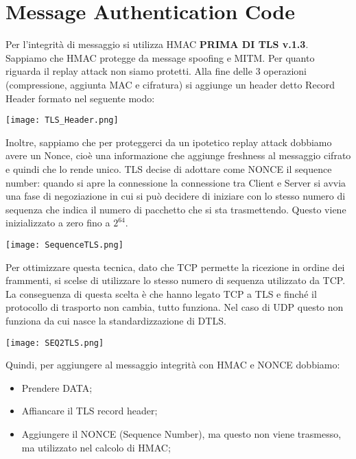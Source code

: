 \documentclass{article}
\theoremstyle{remark}
\begin{document}
\section{Message Authentication Code}
Per l'integrità di messaggio si utilizza HMAC \textbf{PRIMA DI TLS v.1.3}. Sappiamo che HMAC protegge da message spoofing e MITM. Per quanto riguarda il replay attack non siamo protetti. Alla fine delle 3 operazioni (compressione, aggiunta MAC e cifratura) si aggiunge un header detto Record Header formato nel seguente modo:
\begin{center}
    \texttt{[image: TLS\_Header.png]}
\end{center}
Inoltre, sappiamo che per proteggerci da un ipotetico replay attack dobbiamo avere un Nonce, cioè una informazione che aggiunge freshness al messaggio cifrato e quindi che lo rende unico. TLS decise di adottare come NONCE il sequence number: quando si apre la connessione la connessione tra Client e Server si avvia una fase di negoziazione in cui si può decidere di iniziare con lo stesso numero di sequenza che indica il numero di pacchetto che si sta trasmettendo. Questo viene inizializzato a zero fino a $2^{64}$.\newline
\begin{center}
    \texttt{[image: SequenceTLS.png]}
\end{center}
Per ottimizzare questa tecnica, dato che TCP permette la ricezione in ordine dei frammenti, si scelse di utilizzare lo stesso numero di sequenza utilizzato da TCP. La conseguenza di questa scelta è che hanno legato TCP a TLS e finché il protocollo di trasporto non cambia, tutto funziona. Nel caso di UDP questo non funziona da cui nasce la standardizzazione di DTLS.
\begin{center}
    \texttt{[image: SEQ2TLS.png]}
\end{center}
Quindi, per aggiungere al messaggio integrità con HMAC e NONCE dobbiamo:
\begin{itemize}
    \item Prendere DATA;
    \item Affiancare il TLS record header;
    \item Aggiungere il NONCE (Sequence Number), ma questo non viene trasmesso, ma utilizzato nel calcolo di HMAC;
\end{itemize}
\end{document}
